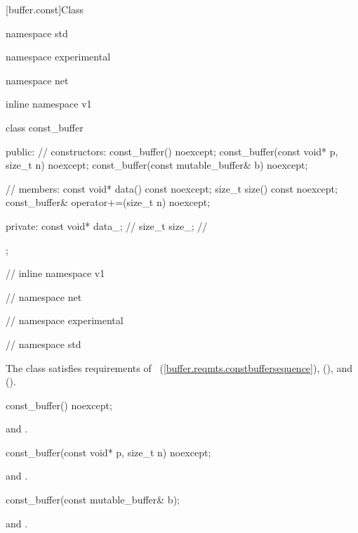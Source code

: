 [buffer.const]{Class }

\begin{codeblock}
namespace std {
namespace experimental {
namespace net {
inline namespace v1 {

  class const_buffer
  {
  public:
    // constructors:
    const_buffer() noexcept;
    const_buffer(const void* p, size_t n) noexcept;
    const_buffer(const mutable_buffer& b) noexcept;

    // members:
    const void* data() const noexcept;
    size_t size() const noexcept;
    const_buffer& operator+=(size_t n) noexcept;

  private:
    const void* data_; // \expos
    size_t size_; // \expos
  };

} // inline namespace v1
} // namespace net
} // namespace experimental
} // namespace std
\end{codeblock}

\pnum
The  class satisfies requirements of ~(\ref{buffer.reqmts.constbuffersequence}),  (), and  ().

%
\begin{itemdecl}
const_buffer() noexcept;
\end{itemdecl}

\begin{itemdescr}
\pnum
\postconditions {} and .
\end{itemdescr}

%
\begin{itemdecl}
const_buffer(const void* p, size_t n) noexcept;
\end{itemdecl}

\begin{itemdescr}
\pnum
\postconditions {} and .
\end{itemdescr}

%
\begin{itemdecl}
const_buffer(const mutable_buffer& b);
\end{itemdecl}

\begin{itemdescr}
\pnum
\postconditions {} and .
\end{itemdescr}

